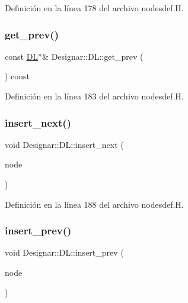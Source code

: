Definición en la línea 178 del archivo nodesdef.\+H.

\mbox{\label{class_designar_1_1_d_l_a2f7ae6156dd09a783b6d1fc726af47c0}} 
\subsubsection{\texorpdfstring{get\+\_\+prev()}{get\_prev()}\hspace{0.1cm}{\footnotesize\ttfamily [2/2]}}
{\footnotesize\ttfamily const \hyperlink{class_designar_1_1_d_l}{DL}$\ast$\& Designar\+::\+D\+L\+::get\+\_\+prev (\begin{DoxyParamCaption}{ }\end{DoxyParamCaption}) const\hspace{0.3cm}{\ttfamily [inline]}}



Definición en la línea 183 del archivo nodesdef.\+H.

\mbox{\label{class_designar_1_1_d_l_a668fa2d4441cdbdba8640fbdab1b220c}} 
\subsubsection{\texorpdfstring{insert\+\_\+next()}{insert\_next()}}
{\footnotesize\ttfamily void Designar\+::\+D\+L\+::insert\+\_\+next (\begin{DoxyParamCaption}\item[{\hyperlink{class_designar_1_1_d_l}{DL} $\ast$}]{node }\end{DoxyParamCaption})\hspace{0.3cm}{\ttfamily [inline]}}



Definición en la línea 188 del archivo nodesdef.\+H.

\mbox{\label{class_designar_1_1_d_l_a44a3c60cd0f8de9811936cbe78d2e85e}} 
\subsubsection{\texorpdfstring{insert\+\_\+prev()}{insert\_prev()}}
{\footnotesize\ttfamily void Designar\+::\+D\+L\+::insert\+\_\+prev (\begin{DoxyParamCaption}\item[{\hyperlink{class_designar_1_1_d_l}{DL} $\ast$}]{node }\end{DoxyParamCaption})\hspace{0.3cm}{\ttfamily [inline]}}



